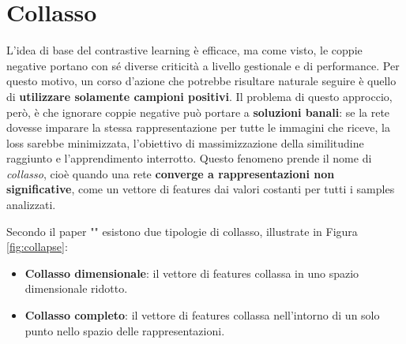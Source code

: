 \section{Collasso}
L'idea di base del contrastive learning è efficace, ma come visto, le coppie negative portano con sé diverse criticità a livello gestionale e di performance. Per questo motivo, un corso d'azione che potrebbe risultare naturale seguire è quello di \textbf{utilizzare solamente campioni positivi}. Il problema di questo approccio, però, è che ignorare coppie negative può portare a \textbf{soluzioni banali}: se la rete dovesse imparare la stessa rappresentazione per tutte le immagini che riceve, la loss sarebbe minimizzata, l'obiettivo di massimizzazione della similitudine raggiunto e l'apprendimento interrotto. Questo fenomeno prende il nome di \textit{collasso}, cioè quando una rete \textbf{converge a rappresentazioni non significative}, come un vettore di features dai valori costanti per tutti i samples analizzati.

Secondo il paper "\textit{}" \cite{collapse_paper} esistono due tipologie di collasso, illustrate in Figura \ref{fig:collapse}:
\begin{itemize}
    \item \textbf{Collasso dimensionale}: il vettore di features collassa in uno spazio dimensionale ridotto.
    \item \textbf{Collasso completo}: il vettore di features collassa nell'intorno di un solo punto nello spazio delle rappresentazioni.
\end{itemize}

